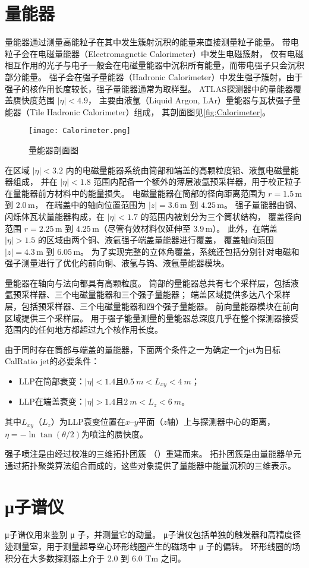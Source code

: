 \section{量能器}
量能器通过测量高能粒子在其中发生簇射沉积的能量来直接测量粒子能量。
带电粒子会在电磁量能器（Electromagnetic Calorimeter）中发生电磁簇射，
仅有电磁相互作用的光子与电子一般会在电磁量能器中沉积所有能量，而带电强子只会沉积部分能量。
强子会在强子量能器（Hadronic Calorimeter）中发生强子簇射，由于强子的核作用长度较长，强子量能器通常为取样型。
ATLAS探测器中的量能器覆盖赝快度范围 \( |\eta| < 4.9 \)，
主要由液氩（Liquid Argon, LAr）量能器与瓦状强子量能器（Tile Hadronic Calorimeter）组成，
其剖面图见\autoref{fig:Calorimeter}。

\begin{figure}[ht]
    \centering
    \texttt{[image: Calorimeter.png]}
    \caption{量能器剖面图\cite{ATLAS_detector}}
    \label{fig:Calorimeter}
\end{figure}

在区域 \( |\eta| < 3.2 \) 内的电磁量能器系统由筒部和端盖的高颗粒度铅、液氩电磁量能器组成，
并在 \( |\eta| < 1.8 \) 范围内配备一个额外的薄层液氩预采样器，用于校正粒子在量能器前方材料中的能量损失。
电磁量能器在筒部的径向距离范围为 \( r = 1.5\,\text{m} \) 到 \( 2.0\,\text{m} \)，
在端盖中的轴向位置范围为 \( |z| = 3.6\,\text{m} \) 到 \( 4.25\,\text{m} \)。
强子量能器由钢、闪烁体瓦状量能器构成，在 \( |\eta| < 1.7 \) 的范围内被划分为三个筒状结构，
覆盖径向范围 \( r = 2.25\,\text{m} \) 到 \( 4.25\,\text{m} \)（尽管有效材料仅延伸至 \( 3.9\,\text{m} \)）。
此外，在端盖 \( |\eta| > 1.5 \) 的区域由两个铜、液氩强子端盖量能器进行覆盖，
覆盖轴向范围 \( |z| = 4.3\,\text{m} \) 到 \( 6.05\,\text{m} \)。
为了实现完整的立体角覆盖，系统还包括分别针对电磁和强子测量进行了优化的前向铜、液氩与钨、液氩量能器模块。

量能器在轴向与法向都具有高颗粒度。
筒部的量能器总共有七个采样层，包括液氩预采样器、三个电磁量能器和三个强子量能器；
端盖区域提供多达八个采样层，包括预采样器、三个电磁量能器和四个强子量能器。
前向量能器模块在前向区域提供三个采样层。
用于强子能量测量的量能器总深度几乎在整个探测器接受范围内的任何地方都超过九个核作用长度。

由于同时存在筒部与端盖的量能器，下面两个条件之一为确定一个jet为目标CalRatio jet的必要条件：
\begin{itemize}
    \item LLP在筒部衰变：$|\eta|<1.4$且$\SI{0.5}{m}<L_{xy}<\SI{4}{m}$；
    \item LLP在端盖衰变：$|\eta|>1.4$且$\SI{2}{m}<L_{z}<\SI{6}{m}$。
\end{itemize}
其中$L_{xy}$（$L_{z}$）为LLP衰变位置在$x$--$y$平面（$z$轴）上与探测器中心的距离，
$\eta=-\ln \tan ({\theta}/{2})$为喷注的赝快度。

强子喷注是由经过校准的三维拓扑团簇 （\topos）重建而来。
拓扑团簇是由量能器单元通过拓扑聚类算法组合而成的，这些对象提供了量能器中能量沉积的三维表示。
\cite{Boccardi:1411357}

\section{μ子谱仪}
μ子谱仪用来鉴别 μ 子，并测量它的动量。
μ子谱仪包括单独的触发器和高精度径迹测量室，用于测量超导空心环形线圈产生的磁场中 μ 子的偏转。
环形线圈的场积分在大多数探测器上介于 2.0 到 6.0 Tm 之间。
